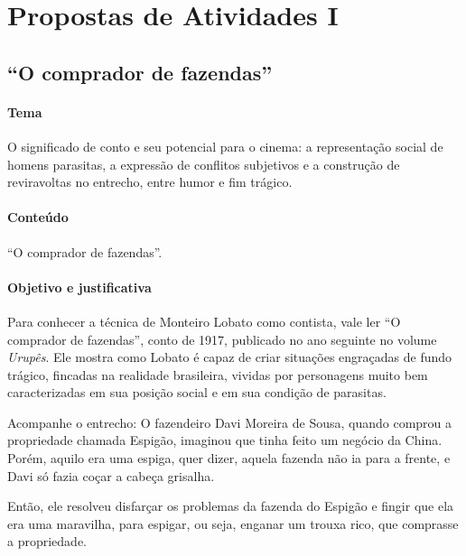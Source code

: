 \documentclass[11pt]{extarticle}
\begin{document}
\tableofcontents


\section{Propostas de Atividades I}

\subsection{``O comprador de fazendas''}

\paragraph{Tema} O significado de conto e seu potencial para o cinema: a representação
social de homens parasitas, a expressão de conflitos subjetivos e a
construção de reviravoltas no entrecho, entre humor e fim trágico.


\paragraph{Conteúdo} ``O comprador de fazendas''.

\paragraph{Objetivo e justificativa} Para conhecer a técnica de Monteiro Lobato 
como contista, vale ler ``O
comprador de fazendas'', conto de 1917, publicado no ano seguinte no
volume \emph{Urupês}. Ele mostra como Lobato é capaz de criar situações
engraçadas de fundo trágico, fincadas na realidade brasileira, vividas
por personagens muito bem caracterizadas em sua posição social e em sua
condição de parasitas.


Acompanhe o entrecho: O fazendeiro Davi Moreira de Sousa, quando comprou
a propriedade chamada Espigão, imaginou que tinha feito um negócio da
China. Porém, aquilo era uma espiga, quer dizer, aquela fazenda não ia
para a frente, e Davi só fazia coçar a cabeça grisalha.

Então, ele resolveu disfarçar os problemas da fazenda do Espigão e
fingir que ela era uma maravilha, para espigar, ou seja, enganar um
trouxa rico, que comprasse a propriedade.
\end{document}
